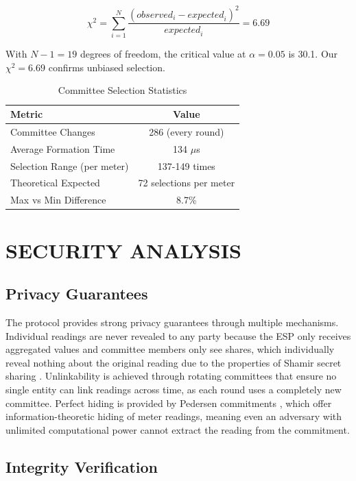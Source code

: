 \documentclass[conference]{IEEEtran}
\begin{document}
\begin{equation}
\chi^2 = \sum_{i=1}^{N} \frac{(\mathit{observed}_i - \mathit{expected}_i)^2}{\mathit{expected}_i} = 6.69
\end{equation}

With $N-1 = 19$ degrees of freedom, the critical value at $\alpha = 0.05$ is 30.1. Our $\chi^2 = 6.69$ confirms unbiased selection.

\begin{table}[h]
\centering
\caption{Committee Selection Statistics}
\label{tab:committee}
\begin{tabular}{|l|c|}
\hline
\textbf{Metric} & \textbf{Value} \\
\hline
Committee Changes & 286 (every round) \\
Average Formation Time & 134 $\mu$s \\
Selection Range (per meter) & 137-149 times \\
Theoretical Expected & 72 selections per meter \\
Max vs Min Difference & 8.7\% \\
\hline
\end{tabular}
\end{table}

\section{SECURITY ANALYSIS}

\subsection{Privacy Guarantees}

The protocol provides strong privacy guarantees through multiple mechanisms. Individual readings are never revealed to any party because the ESP only receives aggregated values and committee members only see shares, which individually reveal nothing about the original reading due to the properties of Shamir secret sharing \cite{shamir1979how}. Unlinkability is achieved through rotating committees that ensure no single entity can link readings across time, as each round uses a completely new committee. Perfect hiding is provided by Pedersen commitments \cite{pedersen1991non}, which offer information-theoretic hiding of meter readings, meaning even an adversary with unlimited computational power cannot extract the reading from the commitment.

\subsection{Integrity Verification}
\end{document}
